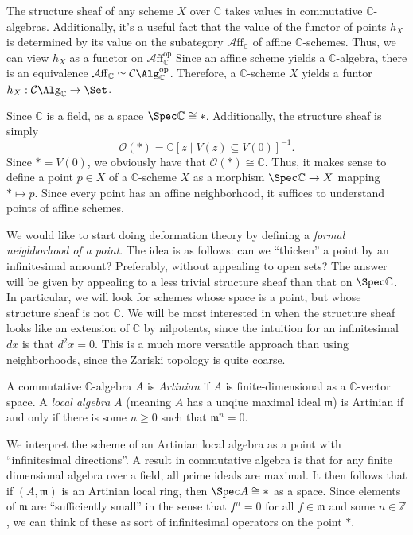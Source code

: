 The structure sheaf of any scheme $X$ over $\mathbb{C} $ takes values in commutative $\mathbb{C} $-algebras. Additionally, it's a useful fact that the value of the functor of points $h_X$ is determined by its value on the subategory $\mathcal{A}\mathrm{ff}_{\mathbb{C} } $ of affine $\mathbb{C} $-schemes. Thus, we can view $h_X$ as a functor on $\mathcal{A} \mathrm{ff}_{\mathbb{C} } ^{\mathrm{op}} $ Since an affine scheme yields a $\mathbb{C} $-algebra, there is an equivalence $\mathcal{A} \mathrm{ff}_{\mathbb{C} } \simeq \mathcal{C} \Alg_{\mathbb{C} } ^{\mathrm{op}} $. Therefore, a $\mathbb{C} $-scheme $X$ yields a funtor $h_X : \mathcal{C}\Alg_{\mathbb{C} }  \to \Set $.

Since $\mathbb{C} $ is a field, as a space $\Spec\mathbb{C} \cong *$. Additionally, the structure sheaf is simply
\[
	\mathcal{O}(*) = \mathbb{C} [z\mid V(z)\subseteq V(0)]^{-1} 
.\]
Since $* = V(0)$, we obviously have that $\mathcal{O} (*)\cong \mathbb{C} $. Thus, it makes sense to define a point $p\in X$ of a $\mathbb{C} $-scheme $X$ as a morphism $\Spec\mathbb{C} \to X$ mapping $*\mapsto p$. Since every point has an affine neighborhood, it suffices to understand points of affine schemes. 

We would like to start doing deformation theory by defining a \emph{formal neighborhood of a point}. The idea is as follows: can we ``thicken'' a point by an infinitesimal amount? Preferably, without appealing to open sets? The answer will be given by appealing to a less trivial structure sheaf than that on $\Spec\mathbb{C} $. In particular, we will look for schemes whose space is a point, but whose structure sheaf is not $\mathbb{C} $. We will be most interested in when the structure sheaf looks like an extension of $\mathbb{C} $ by nilpotents, since the intuition for an infinitesimal $dx$ is that $d^2x=0$. This is a much more versatile approach than using neighborhoods, since the Zariski topology is quite coarse.

\begin{definition}\label{dfn:10-2-1}
	A commutative $\mathbb{C} $-algebra $A$ is \emph{Artinian} if $A$ is finite-dimensional as a $\mathbb{C} $-vector space. A \emph{local algebra} $A$ (meaning $A$ has a unqiue maximal ideal $\mathfrak{m} $) is Artinian if and only if there is some $n\geq 0$ such that $\mathfrak{m} ^n=0$.
\end{definition}

We interpret the scheme of an Artinian local algebra as a point with ``infinitesimal directions''. A result in commutative algebra is that for any finite dimensional algebra over a field, all prime ideals are maximal. It then follows that if $(A,\mathfrak{m} )$ is an Artinian local ring, then $\Spec A \cong *$ as a space. Since elements of $\mathfrak{m} $ are ``sufficiently small'' in the sense that $f^n=0$ for all $f\in \mathfrak{m} $ and some $n\in\mathbb{Z} $, we can think of these as sort of infinitesimal operators on the point $*$.

